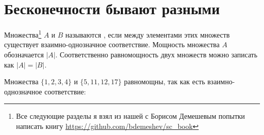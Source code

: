 \documentclass[12pt, a4paper]{article}
\begin{document}




\section{Бесконечности бывают разными}

\begin{mydef}
Множества\footnote{Все следующие разделы я взял из нашей с Борисом Демешевым попытки написать книгу \newline \url{https://github.com/bdemeshev/sc_book}} $A$ и $B$ называются , если между элементами этих множеств существует взаимно-однозначное соответствие. Мощность множества $A$ обозначается $|A|$. Соответственно равномощность двух множеств можно записать как $|A|=|B|$.
\end{mydef}

Множества $\{1,2,3,4\}$ и $\{5,11,12,17\}$ равномощны, так как есть взаимно-однозначное соответствие:
\end{document}
